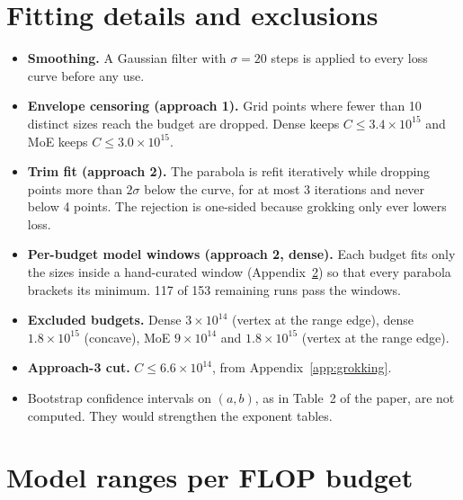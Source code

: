 \documentclass[10pt]{article}
\newcommand{\e}[1]{\times 10^{#1}}
\begin{document}
\clearpage
\section{Fitting details and exclusions}
\label{app:fitting}

\begin{itemize}
  \item \textbf{Smoothing.} A Gaussian filter with $\sigma = 20$ steps is
    applied to every loss curve before any use.
  \item \textbf{Envelope censoring (approach 1).} Grid points where fewer
    than 10 distinct sizes reach the budget are dropped. Dense keeps
    $C \le 3.4\e{15}$ and MoE keeps $C \le 3.0\e{15}$.
  \item \textbf{Trim fit (approach 2).} The parabola is refit iteratively
    while dropping points more than $2\sigma$ below the curve, for at most 3
    iterations and never below 4 points. The rejection is one-sided because
    grokking only ever lowers loss.
  \item \textbf{Per-budget model windows (approach 2, dense).} Each budget
    fits only the sizes inside a hand-curated window
    (Appendix~\ref{app:budgets}) so that every parabola brackets its
    minimum. 117 of 153 remaining runs pass the windows.
  \item \textbf{Excluded budgets.} Dense $3\e{14}$ (vertex at the range
    edge), dense $1.8\e{15}$ (concave), MoE $9\e{14}$ and $1.8\e{15}$
    (vertex at the range edge).
  \item \textbf{Approach-3 cut.} $C \le 6.6\e{14}$, from
    Appendix~\ref{app:grokking}.
  \item Bootstrap confidence intervals on $(a, b)$, as in Table~2 of the
    paper, are not computed. They would strengthen the exponent tables.
\end{itemize}

\clearpage
\section{Model ranges per FLOP budget}
\label{app:budgets}
\end{document}

